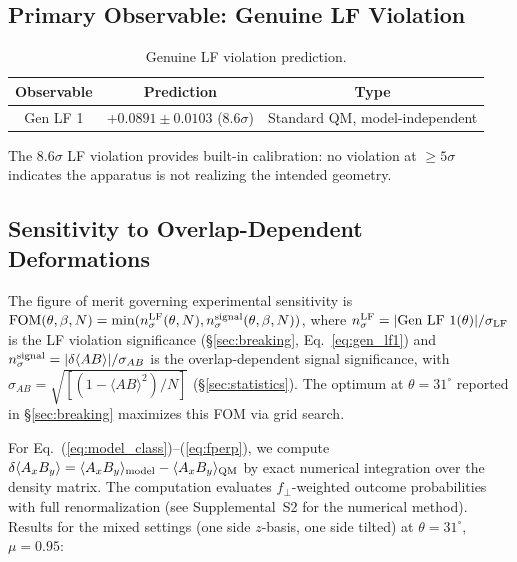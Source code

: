 \documentclass[twocolumn,aps,pra,superscriptaddress,floatfix,10pt]{revtex4-2}
\begin{document}
\subsection{Primary Observable: Genuine LF Violation}
\label{sec:primary_obs}

\begin{table}[H]
\centering
\caption{Genuine LF violation prediction.}
\label{tab:gen_lf}
\begin{tabular}{ccc}
\toprule
Observable & Prediction & Type \\
\midrule
Gen LF 1 & $+0.0891 \pm 0.0103$ ($8.6\sigma$) & Standard QM, model-independent \\
\bottomrule
\end{tabular}
\end{table}

The $8.6\sigma$ LF violation provides built-in calibration: no violation at $\ge 5\sigma$
indicates the apparatus is not realizing the intended geometry.

\subsection{Sensitivity to Overlap-Dependent Deformations}
\label{sec:sensitivity}

The figure of merit governing experimental sensitivity is
$\text{FOM}(\theta, \beta, N) = \min(n_\sigma^{\rm LF}(\theta, N), n_\sigma^{\rm signal}(\theta, \beta, N))$, where
$n_\sigma^{\rm LF} = |\text{Gen LF 1}(\theta)|/\sigma_{\rm LF}$ is the LF violation significance
(\S\ref{sec:breaking}, Eq.~\ref{eq:gen_lf1}) and $n_\sigma^{\rm signal} = |\delta\langle AB\rangle|/\sigma_{AB}$ is the overlap-dependent
signal significance, with $\sigma_{AB} = \sqrt{[(1 - \langle AB\rangle^2)/N]}$ (\S\ref{sec:statistics}). The optimum
at $\theta = 31^\circ$ reported in \S\ref{sec:breaking} maximizes this FOM via grid search.

For Eq.~(\ref{eq:model_class})--(\ref{eq:fperp}), we compute $\delta\langle A_x B_y\rangle = \langle A_x B_y\rangle_{\rm model}
- \langle A_x B_y\rangle_{\rm QM}$ by exact numerical integration over the density matrix. The
computation evaluates $f_\perp$-weighted outcome probabilities with full
renormalization (see Supplemental~S2 for the numerical method). Results for
the mixed settings (one side $z$-basis, one side tilted) at $\theta = 31^\circ$, $\mu = 0.95$:
\end{document}
